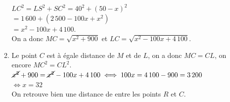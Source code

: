 \begin{corrige}
\begin{enumerate}
\begin{enumerate}
            $LC^2 =LS^2+SC^2 =40^2+(50-x)^2$ \\
            \hspace*{2.53cm} $=1\,600+(2\,500-100x+x^2)$ \\
            \hspace*{2.53cm} $=x^2-100x+4\,100$. \\ [1mm]
            On a donc {\blue $MC =\sqrt{x^2+900}$ et $LC =\sqrt{x^2-100x+4\,100}$}.
         \item Le point $C$ est à égale distance de $M$ et de $L$, on a donc $MC =CL$, on encore $MC^2 =CL^2$. \\
            $\cancel{x^2}+900 =\cancel{x^2}-100x+4\,100 \iff 100x =4\,100-900 =3\,200$ \\
            \hspace*{4.15cm} $\iff x =32$ \\
            {\blue On retrouve bien une distance de  entre les points $R$ et $C$}.
      \end{enumerate}
   \end{enumerate}
\end{corrige}

\bigskip


